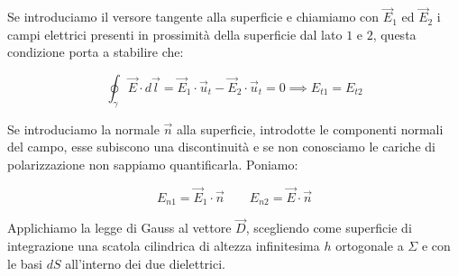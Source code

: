 Se introduciamo il versore tangente alla superficie e chiamiamo con $\vec{E}_1$ ed $\vec{E}_2$ i campi elettrici presenti in prossimità della superficie dal lato $1$ e $2$, questa condizione porta a stabilire che:

\[
	\oint_{\gamma} \vec{E} \cdot d\vec{l} = \vec{E}_1\cdot \vec{u}_t - \vec{E}_2\cdot \vec{u}_t = 0 \implies  E_{t1}=E_{t2}
\]

Se introduciamo la normale $ \vec{n}  $ alla superficie, introdotte le componenti normali del campo, esse subiscono una discontinuità e se non conosciamo le cariche di polarizzazione non sappiamo quantificarla.
Poniamo:

\[
	E_{n1} = \vec{E}_1\cdot \vec{n} \qquad E_{n2}=\vec{E} \cdot \vec{n}
\]

Applichiamo la legge di Gauss al vettore $ \vec{D}  $, scegliendo come superficie di integrazione una scatola cilindrica di altezza infinitesima $h$ ortogonale a $\Sigma$ e con le basi $dS$ all'interno dei due dielettrici.

